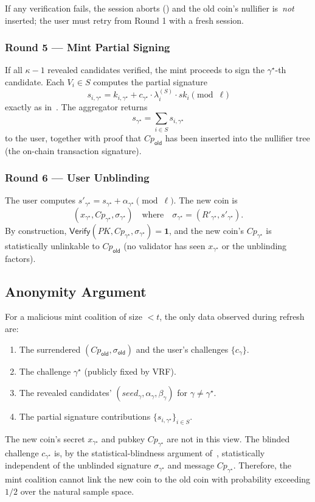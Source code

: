 If any verification fails, the session aborts () and the old coin's nullifier is~\emph{not} inserted; the user must retry from Round 1 with a fresh session.

\subsubsection{Round 5 --- Mint Partial Signing}
\label{sec:refresh-r5}

If all $\kappa-1$ revealed candidates verified, the mint proceeds to sign the $\gamma^\star$-th candidate. Each $V_i \in S$ computes the partial signature
\[
  s_{i, \gamma^\star} = k_{i, \gamma^\star} + c_{\gamma^\star} \cdot \lambda_i^{(S)} \cdot sk_i \pmod{\ell}
\]
exactly as in~. The aggregator returns
\[
  s_{\gamma^\star} = \sum_{i \in S} s_{i, \gamma^\star}
\]
to the user, together with proof that $Cp_{\mathsf{old}}$ has been inserted into the nullifier tree (the on-chain transaction signature).

\subsubsection{Round 6 --- User Unblinding}
\label{sec:refresh-r6}

The user computes $s'_{\gamma^\star} = s_{\gamma^\star} + \alpha_{\gamma^\star} \pmod{\ell}$. The new coin is
\[
  (x_{\gamma^\star}, Cp_{\gamma^\star}, \sigma_{\gamma^\star}) \quad \text{where} \quad \sigma_{\gamma^\star} = (R'_{\gamma^\star}, s'_{\gamma^\star}).
\]
By construction, $\mathsf{Verify}(PK, Cp_{\gamma^\star}, \sigma_{\gamma^\star}) = \mathbf{1}$, and the new coin's $Cp_{\gamma^\star}$ is statistically unlinkable to $Cp_{\mathsf{old}}$ (no validator has seen $x_{\gamma^\star}$ or the unblinding factors).

\subsection{Anonymity Argument}
\label{sec:refresh-anon}

For a malicious mint coalition of size $< t$, the only data observed during refresh are:
\begin{enumerate}[leftmargin=2em,itemsep=0pt]
  \item The surrendered $(Cp_{\mathsf{old}}, \sigma_{\mathsf{old}})$ and the user's challenges $\{c_\gamma\}$.
  \item The challenge $\gamma^\star$ (publicly fixed by VRF).
  \item The revealed candidates' $(seed_\gamma, \alpha_\gamma, \beta_\gamma)$ for $\gamma \neq \gamma^\star$.
  \item The partial signature contributions $\{s_{i, \gamma^\star}\}_{i \in S}$.
\end{enumerate}
The new coin's secret $x_{\gamma^\star}$ and pubkey $Cp_{\gamma^\star}$ are not in this view. The blinded challenge $c_{\gamma^\star}$ is, by the statistical-blindness argument of~, statistically independent of the unblinded signature $\sigma_{\gamma^\star}$ and message $Cp_{\gamma^\star}$. Therefore, the mint coalition cannot link the new coin to the old coin with probability exceeding $1/2$ over the natural sample space.

